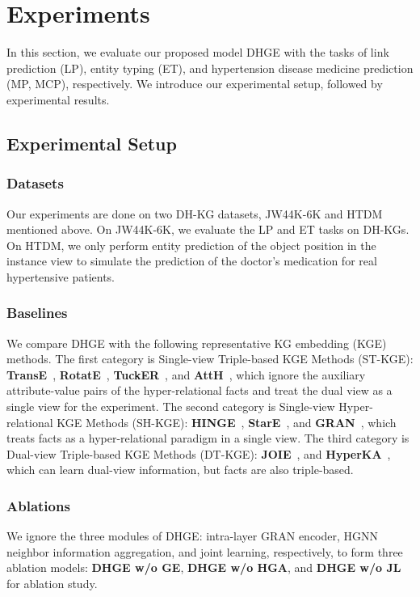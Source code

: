 \documentclass[letterpaper]{article} \usepackage{aaai23}  \usepackage{times}  \usepackage{helvet}  \usepackage{courier}  \usepackage[hyphens]{url}  \usepackage{graphicx} \urlstyle{rm} \def\UrlFont{\rm}  \usepackage{natbib}  \usepackage{caption} \frenchspacing  \setlength{\pdfpagewidth}{8.5in}  \setlength{\pdfpageheight}{11in}  \usepackage{times}
\begin{document}
\section{Experiments}
\label{s6}
In this section, we evaluate our proposed model DHGE with the tasks of link prediction (LP), entity typing (ET), and hypertension disease medicine prediction (MP, MCP), respectively. We introduce our experimental setup, followed by experimental results.
\subsection{Experimental Setup}
\label{6.1}
\subsubsection{Datasets}
Our experiments are done on two DH-KG datasets, JW44K-6K and HTDM mentioned above. On JW44K-6K, we evaluate the LP and ET tasks on DH-KGs. On HTDM, we only perform entity prediction of the object position in the instance view to simulate the prediction of the doctor's medication for real hypertensive patients. 

\subsubsection{Baselines}
We compare DHGE with the following representative KG embedding (KGE) methods. The first category is Single-view Triple-based KGE Methods (ST-KGE): \textbf{TransE}~\citep{TransE}, \textbf{RotatE}~\citep{RotatE}, \textbf{TuckER}~\citep{TuckER}, and \textbf{AttH}~\citep{AttH}, which ignore the auxiliary attribute-value pairs of the hyper-relational facts and treat the dual view as a single view for the experiment. The second category is Single-view Hyper-relational KGE Methods (SH-KGE): \textbf{HINGE}~\citep{HINGE}, \textbf{StarE}~\citep{StarE}, and \textbf{GRAN}~\citep{GRAN}, which treats facts as a hyper-relational paradigm in a single view. The third category is Dual-view Triple-based KGE Methods (DT-KGE): \textbf{JOIE}~\citep{JOIE}, and \textbf{HyperKA}~\citep{HyperKA}, which can learn dual-view information, but facts are also triple-based.

\subsubsection{Ablations}
We ignore the three modules of DHGE: intra-layer GRAN encoder, HGNN neighbor information aggregation, and joint learning, respectively, to form three ablation models: \textbf{DHGE w/o GE}, \textbf{DHGE w/o HGA}, and  \textbf{DHGE w/o JL} for ablation study.
\end{document}
